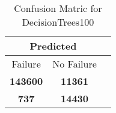 \begin{table}[] 
\caption{Confusion Matric for DecisionTrees100} 
\label{Table: Prediction Accuracy-NoneDecisionTrees10080.0EKF-ignoreReflection-Reflection} 
\centering 
\begin{tabular} 
 {@{}ccc@{}} 
\toprule 
\multicolumn{2}{c}{\textbf{Predicted}}
 \\ \midrule 
\multicolumn{1}{|c|}{Failure} & 
\multicolumn{1}{c|}{No Failure}
 \\ \midrule 
\multicolumn{1}{|c|}{\color{green}\textbf{143600}} & 
\multicolumn{1}{c|}{\color{red}\textbf{11361}}
 \\ \midrule 
\multicolumn{1}{|c|}{\color{red}\textbf{737}} & 
\multicolumn{1}{c|}{\color{green}\textbf{14430}}
 \\ \bottomrule 
\end{tabular} 
\end{table} 
